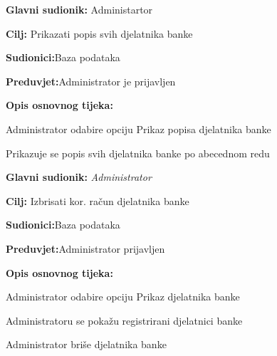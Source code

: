 \documentclass[11pt]{book}
\begin{document}
\noindent {}
\begin{packed_item}
	
	\item \textbf{Glavni sudionik: }{Administartor}
	\item  \textbf{Cilj:} {Prikazati popis svih djelatnika banke}
	\item  \textbf{Sudionici:}{Baza podataka} 
	\item  \textbf{Preduvjet:}{Administrator je prijavljen}
	\item  \textbf{Opis osnovnog tijeka:}
	
	\item[] \begin{packed_enum}
		
		\item {Administrator odabire opciju Prikaz popisa djelatnika banke}
		\item {Prikazuje se popis svih djelatnika banke po abecednom redu}
		\end{packed_enum}
\end{packed_item}
\noindent {}
\begin{packed_item}
	
	\item \textbf{Glavni sudionik: }\textit{Administrator}
	\item  \textbf{Cilj:} {Izbrisati kor. račun djelatnika banke}
	\item  \textbf{Sudionici:}{Baza podataka}
	\item  \textbf{Preduvjet:}{Administrator prijavljen}
	\item  \textbf{Opis osnovnog tijeka:}
	
	\item[] \begin{packed_enum}
		
		\item {Administrator odabire opciju Prikaz djelatnika banke}
		\item {Administratoru se pokažu registrirani djelatnici banke}
		\item {Administrator briše djelatnika banke}
		
	\end{packed_enum}
	
\end{packed_item}
\end{document}

